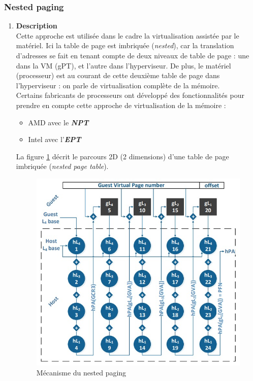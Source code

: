 \subsubsection{Nested paging}
\label{subsubsection:nested_paging}
\begin{enumerate}[label=\textbf{(\roman*)}]
    \item \textbf{Description}\\
    Cette approche est utilisée dans le cadre la virtualisation assistée par le matériel. Ici la table de page est imbriquée (\textit{nested}), car la translation d'adresses se fait en tenant compte de deux niveaux de table de page : une dans la VM (\acs{gPT}), et l'autre dans l'hyperviseur. De plus, le matériel (processeur) est au courant de cette deuxième table de page dans l'hyperviseur : on parle de virtualisation complète de la mémoire.\\
    Certains fabricants de processeurs ont développé des fonctionnalités pour prendre en compte cette approche de virtualisation de la mémoire :
    \begin{itemize}
        \item AMD avec le \textit{\textbf{\ac{NPT}}}
        \item Intel avec l'\textit{\textbf{\ac{EPT}}}
    \end{itemize}
    
    La figure \ref{fig:parcours_2D} décrit le parcours 2D (2 dimensions) d'une table de page imbriquée (\textit{nested page table}).
    \begin{figure}[htp]
        \centering
        \includegraphics[scale=.5]{chapters/1/fig1/nested_paging}
        \caption{Mécanisme du nested paging}
        \label{fig:parcours_2D}
    \end{figure}


\end{enumerate}
